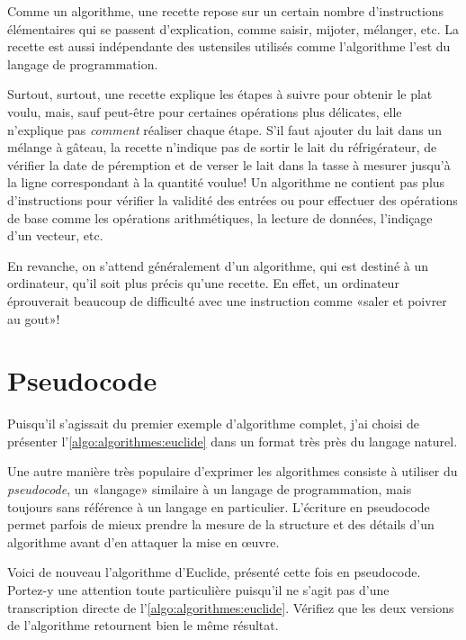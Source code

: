 Comme un algorithme, une recette repose sur un certain nombre
d'instructions élémentaires qui se passent d'explication, comme
saisir, mijoter, mélanger, etc. La recette est aussi indépendante des
ustensiles utilisés comme l'algorithme l'est du langage de
programmation.

Surtout, surtout, une recette explique les étapes à suivre pour
obtenir le plat voulu, mais, sauf peut-être pour certaines opérations
plus délicates, elle n'explique pas \emph{comment} réaliser chaque
étape. S'il faut ajouter du lait dans un mélange à gâteau, la recette
n'indique pas de sortir le lait du réfrigérateur, de vérifier la date
de péremption et de verser le lait dans la tasse à mesurer jusqu'à la
ligne correspondant à la quantité voulue! Un algorithme ne contient pas
plus d'instructions pour vérifier la validité des entrées ou pour
effectuer des opérations de base comme les opérations arithmétiques,
la lecture de données, l'indiçage d'un vecteur, etc.

En revanche, on s'attend généralement d'un algorithme, qui est destiné
à un ordinateur, qu'il soit plus précis qu'une recette. En effet, un
ordinateur éprouverait beaucoup de difficulté avec une instruction
comme «saler et poivrer au gout»!



\section{Pseudocode}
\label{sec:algorithmes:pseudocode}

Puisqu'il s'agissait du premier exemple d'algorithme complet, j'ai
choisi de présenter l'\autoref{algo:algorithmes:euclide} dans un
format très près du langage naturel.

Une autre manière très populaire d'exprimer les algorithmes consiste à
utiliser du \emph{pseudocode}, un «langage»
similaire à un langage de programmation, mais toujours sans référence
à un langage en particulier. L'écriture en pseudocode permet parfois
de mieux prendre la mesure de la structure et des détails d'un
algorithme avant d'en attaquer la mise en œuvre.

Voici de nouveau l'algorithme
d'Euclide, présenté cette fois en pseudocode. Portez-y une attention
toute particulière puisqu'il ne s'agit pas d'une transcription directe
de l'\autoref{algo:algorithmes:euclide}. Vérifiez que les deux
versions de l'algorithme retournent bien le même résultat.

